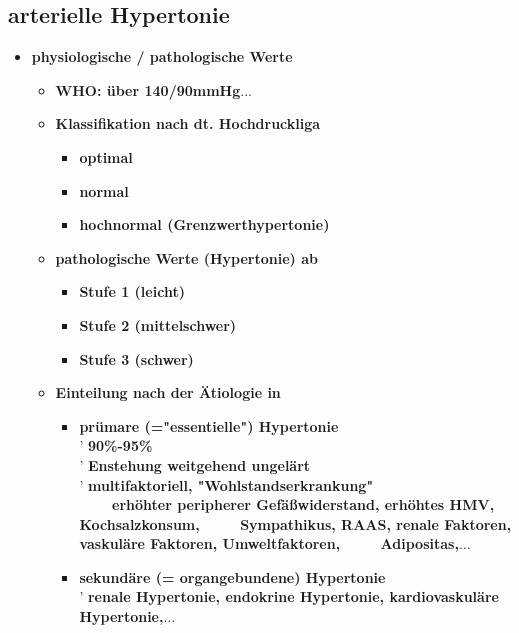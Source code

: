 	\subsection{arterielle Hypertonie}
		\begin{itemize}
			\item \textbf{physiologische / pathologische Werte}
				\begin{itemize}
					\item \textbf{WHO: über 140/90mmHg$\dots$}
					\item \textbf{Klassifikation nach dt. Hochdruckliga}
						\begin{itemize}
							\item \textbf{optimal}
							\item \textbf{normal}
							\item \textbf{hochnormal (Grenzwerthypertonie)}
						\end{itemize}
					\item \textbf{pathologische Werte (Hypertonie) ab}
						\begin{itemize}
							\item \textbf{Stufe 1 (leicht)}
							\item \textbf{Stufe 2 (mittelschwer)}
							\item \textbf{Stufe 3 (schwer)}
						\end{itemize}
					\item \textbf{Einteilung nach der Ätiologie in}
						\begin{itemize}
							\item \textbf{prümare (="essentielle") Hypertonie}\\
								' \textbf{90\%-95\%}\\
								' \textbf{Enstehung weitgehend ungelärt}\\
								' \textbf{multifaktoriell, "Wohlstandserkrankung"}\\
								$\mbox{}\qquad$ \textbf{erhöhter peripherer Gefäßwiderstand, erhöhtes HMV, Kochsalzkonsum,}\linebreak
								$\mbox{}\qquad\:$ \textbf{Sympathikus, RAAS, renale Faktoren, vaskuläre Faktoren, Umweltfaktoren,}\linebreak
								$\mbox{}\qquad\:$ \textbf{Adipositas,$\dots$}
							\item \textbf{sekundäre (= organgebundene) Hypertonie}\\
								' \textbf{renale Hypertonie, endokrine Hypertonie, kardiovaskuläre Hypertonie,$\dots$}
						\end{itemize}

\end{itemize}
\end{itemize}
